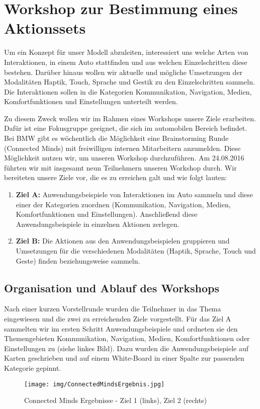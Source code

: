 \chapter[Workshop Connected Minds]{Workshop zur Bestimmung eines Aktionssets}\label{cha:Workshop}
Um ein Konzept für unser Modell abzuleiten, interessiert uns welche Arten von Interaktionen, in einem Auto stattfinden und aus welchen Einzelschritten diese bestehen.
Darüber hinaus wollen wir aktuelle und mögliche Umsetzungen der Modalitäten Haptik, Touch, Sprache und Gestik zu den Einzelschritten sammeln.
Die Interaktionen sollen in die Kategorien Kommunikation, Navigation, Medien, Komfortfunktionen und Einstellungen unterteilt werden.

Zu diesem Zweck wollen wir im Rahmen eines Workshops unsere Ziele erarbeiten.
Dafür ist eine Fokusgruppe geeignet, die sich im automobilen Bereich befindet.   
Bei BMW gibt es wöchentlich die Möglichkeit eine Brainstorming Runde (Connected Minds) mit freiwilligen internen Mitarbeitern anzumelden.
Diese Möglichkeit nutzen wir, um unseren Workshop durchzuführen.
Am 24.08.2016 führten wir mit insgesamt neun Teilnehmern unseren Workshop durch. 
Wir bereiteten unsere Ziele vor, die es zu erreichen galt und wie folgt lauten:  
\begin{enumerate}
	\item \textbf{Ziel A:} Anwendungsbeispiele von Interaktionen im Auto sammeln und diese einer der Kategorien zuordnen (Kommunikation, Navigation, Medien, Komfortfunktionen und Einstellungen). Anschließend diese Anwendungsbeispiele in einzelnen Aktionen zerlegen. 
	\item \textbf{Ziel B:} Die Aktionen aus den Anwendungsbeispielen gruppieren und Umsetzungen für die verschiedenen Modalitäten (Haptik, Sprache, Touch und Geste) finden beziehungsweise sammeln.
\end{enumerate}
\section[Ablauf]{Organisation und Ablauf des Workshops}
Nach einer kurzen Vorstellrunde wurden die Teilnehmer in das Thema eingewiesen und die zwei zu erreichenden Ziele vorgestellt. 
Für das Ziel A sammelten wir im ersten Schritt Anwendungsbeispiele und ordneten sie den Themengebieten Kommunikation, Navigation, Medien, Komfortfunktionen oder Einstellungen zu (siehe  linkes Bild). Dazu wurden die Anwendungsbeispiele auf Karten geschrieben und auf einem White-Board in einer Spalte zur passenden Kategorie gepinnt.
\begin{figure}[ht]
  \centering
  \texttt{[image: img/ConnectedMindsErgebnis.jpg]}
  \caption[Connected Minds Ergebnisse]{Connected Minds Ergebnisse - Ziel 1 (links), Ziel 2 (rechts)}
  \label{fig:ConnectedMindErgebnisse}
\end{figure}  

